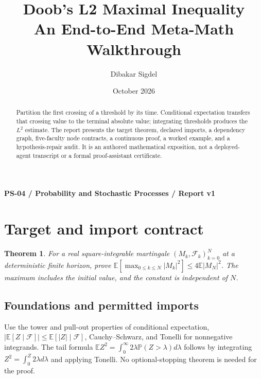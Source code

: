 \documentclass[preprint,12pt,aps,pra,showkeys,amsmath,amssymb,superscriptaddress,floatfix]{revtex4-2}
\newtheorem{theorem}{Theorem}[section]
\theoremstyle{definition}
\theoremstyle{remark}
\begin{document}
\title{Doob's L2 Maximal Inequality\\[4pt]\large An End-to-End Meta-Math Walkthrough}

\author{Dibakar Sigdel}


\date{October 2026}

\begin{abstract}

Partition the first crossing of a threshold by its time. Conditional
expectation transfers that crossing value to the terminal absolute
value; integrating thresholds produces the \(L^2\) estimate. The report
presents the target theorem, declared imports, a dependency graph,
five-faculty node contracts, a continuous proof, a worked example, and a
hypothesis-repair audit. It is an authored mathematical exposition, not
a deployed-agent transcript or a formal proof-assistant certificate.

\end{abstract}\maketitle\linespread{1.12}\selectfont

\noindent\textbf{PS-04 / Probability and Stochastic Processes / Report v1}

\section{Target and import contract}

\begin{theorem}

For a real square-integrable martingale \((M_k,\mathcal F_k)_{k=0}^N\)
at a deterministic finite horizon, prove
\(\mathbb E[\max_{0\le k\le N}|M_k|^2]\le4\mathbb E|M_N|^2\). The
maximum includes the initial value, and the constant is independent of
\(N\).

\end{theorem}

\subsection{Foundations and permitted imports}

Use the tower and pull-out properties of conditional expectation,
\(|\mathbb E[Z\mid\mathcal F]|\le\mathbb E[|Z|\mid\mathcal F]\),
Cauchy--Schwarz, and Tonelli for nonnegative integrands. The tail
formula
\(\mathbb EZ^2=\int_0^\infty2\lambda\mathbb P(Z>\lambda)d\lambda\)
follows by integrating \(Z^2=\int_0^Z2\lambda d\lambda\) and applying
Tonelli. No optional-stopping theorem is needed for the proof.
\end{document}
